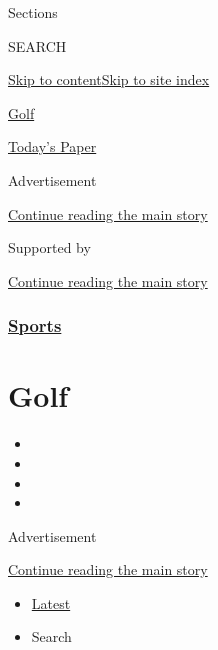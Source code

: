 Sections

SEARCH

\protect\hyperlink{site-content}{Skip to
content}\protect\hyperlink{site-index}{Skip to site index}

\href{https://www.nytimes.com/section/sports/golf}{Golf}

\href{https://myaccount.nytimes.com/auth/login?response_type=cookie\&client_id=vi}{}

\href{https://www.nytimes.com/section/todayspaper}{Today's Paper}

Advertisement

\protect\hyperlink{after-top}{Continue reading the main story}

Supported by

\protect\hyperlink{after-sponsor}{Continue reading the main story}

\hypertarget{sports}{%
\subsubsection{\texorpdfstring{\href{/section/sports}{Sports}}{Sports}}\label{sports}}

\hypertarget{golf}{%
\section{Golf}\label{golf}}

\begin{itemize}
\item
\item
\item
\item
\end{itemize}

Advertisement

\protect\hyperlink{after-subheader}{Continue reading the main story}

\begin{itemize}
\tightlist
\item
  \protect\hyperlink{stream-panel}{Latest}
\item
  Search
\end{itemize}

